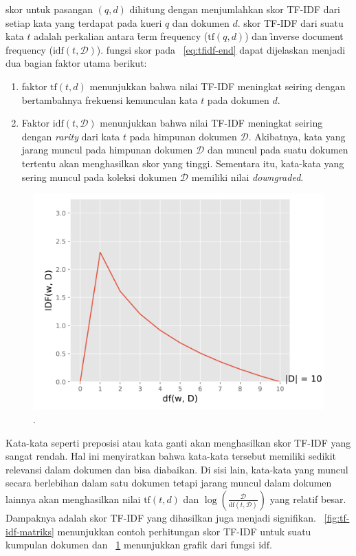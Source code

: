     skor untuk pasangan $(q,d)$ dihitung dengan menjumlahkan skor TF-IDF dari setiap kata yang terdapat pada kueri $q$ dan dokumen $d$. skor TF-IDF dari suatu kata $t$ adalah perkalian antara \f{term frequency} ($\text{tf}(q,d)$) dan \f{inverse document frequency} ($\text{idf}(t,\mathcal{D})$). fungsi skor pada \equ~\ref{eq:tfidf-end} dapat dijelaskan menjadi dua bagian faktor utama berikut:
    \begin{enumerate}
        \item faktor $\text{tf}(t, d)$ menunjukkan bahwa nilai TF-IDF meningkat seiring dengan bertambahnya frekuensi kemunculan kata $t$ pada dokumen $d$.
        \item Faktor $\text{idf}(t, \mathcal{D})$ menunjukkan bahwa nilai TF-IDF meningkat seiring dengan \textit{rarity} dari kata $t$ pada himpunan dokumen $\mathcal{D}$. Akibatnya, kata yang jarang muncul pada himpunan dokumen $\mathcal{D}$ dan muncul pada suatu dokumen tertentu akan menghasilkan skor yang tinggi. Sementara itu, kata-kata yang sering muncul pada koleksi dokumen $\mathcal{D}$ memiliki nilai \textit{downgraded}.
    \end{enumerate}
    \begin{figure}
        \centering
        \includegraphics[width=1\textwidth]{assets/pics/idf-graph.png}
        \caption{\license.}
        \label{fig:idf-graph}
    \end{figure}
    
    Kata-kata seperti preposisi atau kata ganti akan menghasilkan skor TF-IDF yang sangat rendah. Hal ini menyiratkan bahwa kata-kata tersebut memiliki sedikit relevansi dalam dokumen dan bisa diabaikan. Di sisi lain, kata-kata yang muncul secara berlebihan dalam satu dokumen tetapi jarang muncul dalam dokumen lainnya akan menghasilkan nilai $\text{tf}(t, d)$ dan $\log \left(\frac{\mathcal{D}}{\text{df}(t, \mathcal{D})}\right)$ yang relatif besar. Dampaknya adalah skor TF-IDF yang dihasilkan juga menjadi signifikan. \pic~\ref{fig:tf-idf-matriks} menunjukkan contoh perhitungan skor TF-IDF untuk suatu kumpulan dokumen dan \pic~\ref{fig:idf-graph} menunjukkan grafik dari fungsi $\text{idf}$.
    
